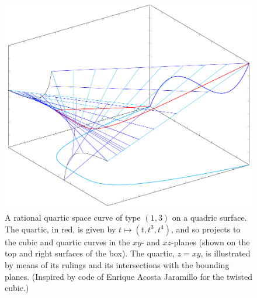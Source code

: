 \begin{figure}
\Small
\hskip-46pt\vbox{\vskip-24pt\hbox{\includegraphics[scale=0.6,angle=74]{main/Fig03-newfigg}}\vskip-20pt}\hskip-50pt
%
%
%
%
%
%
%
%
%
%
%
%
%
%
%
%
%
%
%
%
%
%
%
%
%
%
%
\caption{A rational quartic space curve of type $(1,3)$ on a quadric
  surface. The quartic, in red, is given by $t\mapsto (t,t^3,t^4)$,
  and so projects to the cubic and quartic curves in the
  $xy$- and $xz$-planes (shown on the top and right surfaces of the
  box). The quartic, $z=xy$, is illustrated by means of its rulings
  and its intersections with the bounding planes. (Inspired by code of
  Enrique Acosta Jaramillo for the twisted cubic.) 
}
\end{figure}

